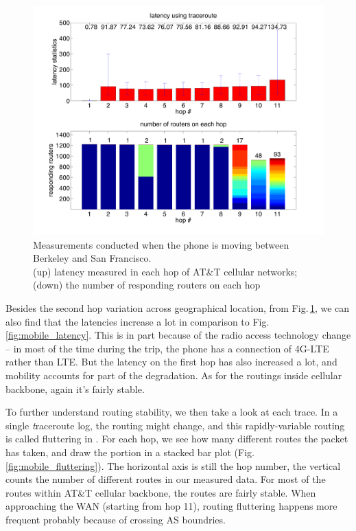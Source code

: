 \begin{figure}
  \centering
  \includegraphics[width=\linewidth]{../figs/mobile_sfo.pdf}
  \vspace{-1em}
  \caption{Measurements conducted when the phone is moving between Berkeley and San Francisco.\\ (up) latency measured in each hop of AT\&T cellular networks; (down) the number of responding routers on each hop}
  \label{fig:mobile_mobile}
\end{figure}

Besides the second hop variation across geographical location, from Fig.\,\ref{fig:mobile_mobile}, we can also find that the latencies increase a lot in comparison to Fig.\,\ref{fig:mobile_latency}. This is in part because of the radio access technology change -- in most of the time during the trip, the phone has a connection of 4G-LTE rather than LTE. But the latency on the first hop has also increased a lot, and mobility accounts for part of the degradation. As for the routings inside cellular backbone, again it's fairly stable.

To further understand routing stability, we then take a look at each trace. In a single {\textit traceroute} log, the routing might change, and this rapidly-variable routing is called fluttering in \cite{paxson1997measurements}. For each hop, we see how many different routes the packet has taken, and draw the portion in a stacked bar plot (Fig.\,\ref{fig:mobile_fluttering}). The horizontal axis is still the hop number, the vertical counts the number of different routes in our measured data. For most of the routes within AT\&T cellular backbone, the routes are fairly stable. When approaching the WAN (starting from hop 11), routing fluttering happens more frequent probably because of crossing AS boundries.

